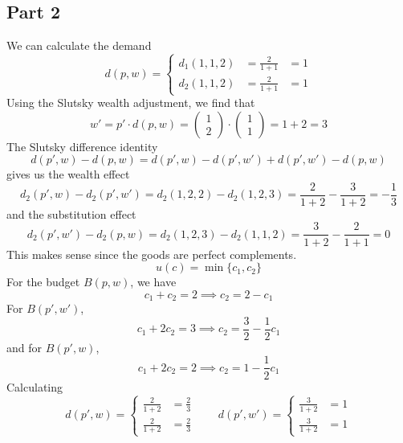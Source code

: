 \documentclass[12pt]{extarticle}
\numberwithin{table}{section}
\numberwithin{figure}{section}
\numberwithin{equation}{section}
\begin{document}
\subsection*{Part 2}
We can calculate the demand
\begin{equation}
	d(p, w) = \left\{\begin{array}{rll}
		d_1(1, 1, 2) & = \frac{2}{1 + 1} & = 1 \\
		d_2(1, 1, 2) & = \frac{2}{1 + 1} & = 1
	\end{array}\right.
\end{equation}
Using the Slutsky wealth adjustment, we find that
\begin{equation}
	w' = p' \cdot d(p, w) = \begin{pmatrix}1 \\ 2\end{pmatrix} \cdot \begin{pmatrix}1 \\ 1\end{pmatrix} = 1 + 2 = 3
\end{equation}
The Slutsky difference identity
\begin{equation}
	d(p', w) - d(p, w) = d(p', w) - d(p', w') + d(p', w') - d(p, w)
\end{equation}
gives us the wealth effect
\begin{equation}
	d_2(p', w) - d_2(p', w') = d_2(1, 2, 2) - d_2(1, 2, 3) = \frac{2}{1 + 2} - \frac{3}{1 + 2} = -\frac{1}{3}
\end{equation}
and the substitution effect
\begin{equation}
	d_2(p', w') - d_2(p, w) = d_2(1, 2, 3) - d_2(1, 1, 2) = \frac{3}{1 + 2} - \frac{2}{1 + 1} = 0
\end{equation}
This makes sense since the goods are perfect complements.
\begin{equation}
	u(c) = \min\{c_1, c_2\}
\end{equation}
For the budget $B(p, w)$, we have
\begin{equation}
	c_1 + c_2 = 2 \implies c_2 = 2 - c_1
\end{equation}
For $B(p', w')$,
\begin{equation}
	c_1 + 2c_2 = 3 \implies c_2 = \frac{3}{2} - \frac{1}{2}c_1
\end{equation}
and for $B(p', w)$,
\begin{equation}
	c_1 + 2c_2 = 2 \implies c_2 = 1 - \frac{1}{2}c_1
\end{equation}
Calculating
\begin{equation}
	d(p', w) = \left\{\begin{array}{rl} \frac{2}{1 + 2} &= \frac{2}{3} \\ \frac{2}{1 + 2} &= \frac{2}{3}\end{array}\right.
	\qquad d(p', w') = \left\{\begin{array}{rl} \frac{3}{1 + 2} &= 1 \\ \frac{3}{1 + 2} &= 1\end{array}\right.
\end{equation}
\end{document}
